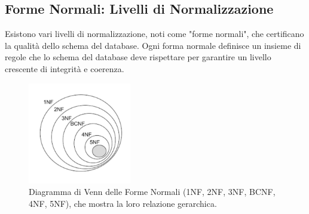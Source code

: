 \subsection{Forme Normali: Livelli di Normalizzazione}
Esistono vari livelli di normalizzazione, noti come "forme normali", che certificano la qualità dello schema del database. Ogni forma normale definisce un insieme di regole che lo schema del database deve rispettare per garantire un livello crescente di integrità e coerenza.
\begin{figure}[h!]
    \centering
    \includegraphics[width=0.4\textwidth]{immagini/nf_diagramma_venn.png} %
    \caption{Diagramma di Venn delle Forme Normali (1NF, 2NF, 3NF, BCNF, 4NF, 5NF), che mostra la loro relazione gerarchica.}
    \label{fig:nf_venn_diagram}
\end{figure}

